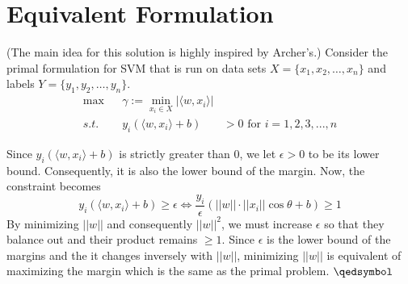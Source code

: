 \chapter{Equivalent Formulation}

(The main idea for this solution is highly inspired by Archer's.) Consider the primal formulation for SVM that is run on data sets $X = \{x_1, x_2, \ldots, x_n\}$ and labels $Y = \{y_1, y_2, \ldots, y_n\}$.
\[
\begin{aligned}
    \max && \gamma := \min_{x_i \in X} |\langle w, x_i \rangle| & \\
    s.t. && y_i(\langle w, x_i \rangle + b) &> 0 \text{ for $i = 1, 2, 3, ..., n$}
\end{aligned}
\]

Since $y_i(\langle w, x_i \rangle + b)$ is strictly greater than 0, we let $\epsilon > 0$ to be its lower bound. Consequently, it is also the lower bound of the margin.  Now, the constraint becomes
\[ y_i(\langle w, x_i \rangle + b) \geq \epsilon \iff \frac{y_i}{\epsilon}(||w||\cdot||x_i||\cos\theta + b) \geq 1 \]
By minimizing $||w||$ and consequently $||w||^2$, we must increase $\epsilon$ so that they balance out and their product remains $\geq 1$.
Since $\epsilon$ is the lower bound of the margins and the it changes inversely with $||w||$, minimizing $||w||$ is equivalent of maximizing the margin which is the same as the primal problem. $\qedsymbol$